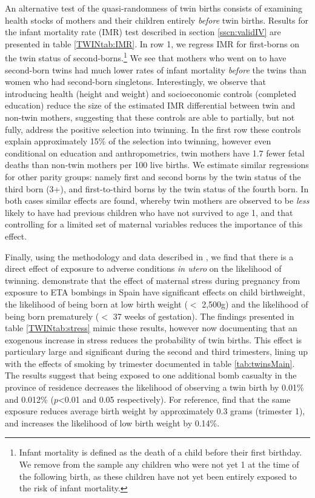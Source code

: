 \documentclass[subeqn]{article}
\begin{document}
\begin{spacing}{1.4}
An alternative test of the quasi-randomness of twin births consists of examining
health stocks of mothers and their children entirely \emph{before} twin births.
Results for the infant mortality rate (IMR) test described in section
\ref{sscn:validIV} are presented in table \ref{TWINtab:IMR}. In row 1, we regress
IMR for first-borns on the twin status of second-borns.\footnote{Infant mortality
  is defined as the death of a child before their first birthday. We remove from
  the sample any children who were not yet 1 at the time of the following birth,
  as these children have not yet been entirely exposed to the risk of infant
  mortality.}  We see that mothers who went on to have second-born twins had much
lower rates of infant mortality \emph{before} the twins than women who had
second-born singletons.  Interestingly, we observe that introducing health (height
and weight) and socioeconomic controls (completed education) reduce the size of
the estimated IMR differential between twin and non-twin mothers, suggesting that
these controls are able to partially, but not fully, address the positive
selection into twinning.  In the first row these controls explain approximately
15\% of the selection into twinning, however even conditional on education and
anthropometrics, twin mothers have 1.7 fewer fetal deaths than non-twin mothers
per 100 live births.  We estimate similar regressions for other parity groups:
namely first and second borns by the twin status of the third born (3+), and
first-to-third borns by the twin status of the fourth born.  In both cases
similar effects are found, whereby twin mothers are observed to be \emph{less}
likely to have had previous children who have not survived to age 1, and that
controlling for a limited set of maternal variables reduces the importance of
this effect.

Finally, using the methodology and data described in \citet{QuintanaRodenas2014},
we find that there is a direct effect of exposure to adverse conditions
\emph{in utero} on the likelihood of twinning.  \citet{QuintanaRodenas2014}
demonstrate that the effect of maternal stress during pregnancy from exposure to
ETA bombings in Spain have significant effects on child birthweight, the
likelihood of being born at low birth weight ($<$ 2,500g) and the likelihood of
being born prematurely ($<$ 37 weeks of gestation).  The findings presented
in table \ref{TWINtab:stress} mimic these results, however now documenting
that an exogenous increase in stress reduces the probability of twin births.
This effect is particulary large and significant during the second and third
trimesters, lining up with the effects of smoking by trimester documented in
table \ref{tab:twinsMain}.  The results suggest that being exposed to one
additional bomb casualty in the province of residence decreases the likelihood
of observing a twin birth by 0.01\% and 0.012\% ($p$<0.01 and 0.05 respectively).
For reference, \citet{QuintanaRodenas2014} find that the same exposure reduces
average birth weight by approximately 0.3 grams (trimester 1), and increases
the likelihood of low birth weight by 0.14\%.


\end{spacing}
\end{document}
